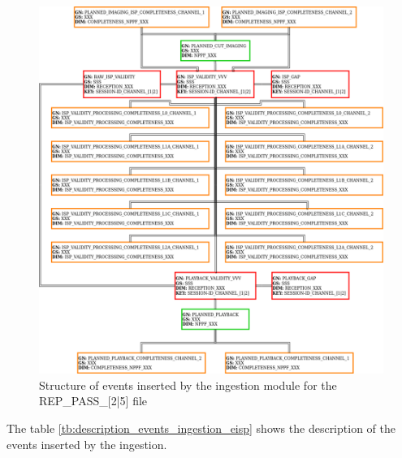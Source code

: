\begin{figure}[H]
  \begin{center}
	\centering\includegraphics[width=150mm]{../fig/structure_ingestion_eisp.png}
	\caption{Structure of events inserted by the ingestion module for the REP\_PASS\_[2|5] file}
	\label{fg:structure_ingestion_eisp}
  \end{center}
\end{figure}

The table \ref{tb:description_events_ingestion_eisp} shows the description of the events inserted by the ingestion.

